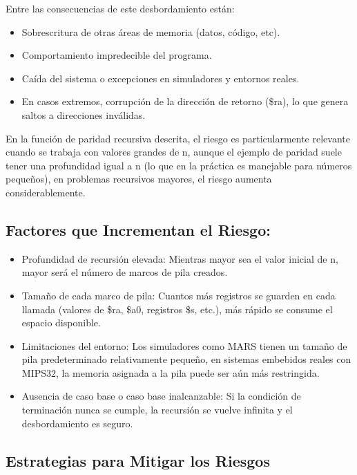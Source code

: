 \documentclass[12pt, letterpaper]{article}
\begin{document}
Entre las consecuencias de este desbordamiento están:

\begin{itemize}
    \item Sobrescritura de otras áreas de memoria (datos, código, etc).
    \item Comportamiento impredecible del programa.
    \item Caída del sistema o excepciones en simuladores y entornos reales.
    \item En casos extremos, corrupción de la dirección de retorno (\$ra), lo que genera saltos a direcciones inválidas.
\end{itemize}

En la función de paridad recursiva descrita, el riesgo es particularmente relevante cuando se trabaja con valores grandes de n, aunque el ejemplo de paridad suele tener una profundidad igual a n (lo que en la práctica es manejable para números pequeños), en problemas recursivos mayores, el riesgo aumenta considerablemente.

\subsection*{Factores que Incrementan el Riesgo:}

\begin{itemize}
    \item Profundidad de recursión elevada: Mientras mayor sea el valor inicial de n, mayor será el número de marcos de pila creados.
    \item Tamaño de cada marco de pila: Cuantos más registros se guarden en cada llamada (valores de \$ra, \$a0, registros \$s, etc.), más rápido se consume el espacio disponible.
    \item Limitaciones del entorno: Los simuladores como MARS tienen un tamaño de pila predeterminado relativamente pequeño, en sistemas embebidos reales con MIPS32, la memoria asignada a la pila puede ser aún más restringida.
    \item Ausencia de caso base o caso base inalcanzable: Si la condición de terminación nunca se cumple, la recursión se vuelve infinita y el desbordamiento es seguro.
\end{itemize}

\subsection*{Estrategias para Mitigar los Riesgos}
\end{document}
